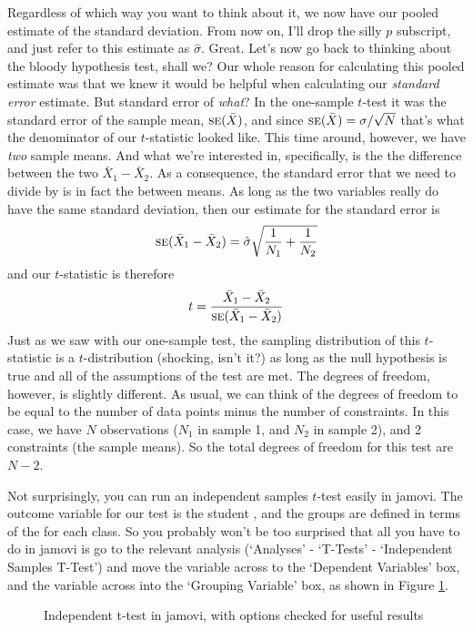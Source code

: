 Regardless of which way you want to think about it, we now have our pooled estimate of the standard deviation. From now on, I'll drop the silly $p$ subscript, and just refer to this estimate as $\hat\sigma$. Great. Let's now go back to thinking about the bloody hypothesis test, shall we? Our whole reason for calculating this pooled estimate was that we knew it would be helpful when calculating our {\it standard error} estimate. But standard error of {\it what}? In the one-sample $t$-test it was the standard error of the sample mean, $\mbox{\textsc{se}}(\bar{X})$, and since $\mbox{\textsc{se}}(\bar{X}) = \sigma / \sqrt{N}$ that's what the denominator of our $t$-statistic looked like. This time around, however, we have {\it two} sample means. And what we're interested in, specifically, is the the difference between the two $\bar{X}_1 - \bar{X}_2$. As a consequence, the standard error that we need to divide by is in fact the  between means. As long as the two variables really do have the same standard deviation, then our estimate for the standard error is
$$
\mbox{\textsc{se}}(\bar{X}_1 - \bar{X}_2) = \hat\sigma \sqrt{\frac{1}{N_1} + \frac{1}{N_2}}
$$
and our $t$-statistic is therefore 
$$
t = \frac{\bar{X}_1 - \bar{X}_2}{\mbox{\textsc{se}}(\bar{X}_1 - \bar{X}_2)}
$$
Just as we saw with our one-sample test, the sampling distribution of this $t$-statistic is a $t$-distribution (shocking, isn't it?) as long as the null hypothesis is true and all of the assumptions of the test are met. The degrees of freedom, however, is slightly different. As usual, we can think of the degrees of freedom to be equal to the number of data points minus the number of constraints. In this case, we have $N$ observations ($N_1$ in sample 1, and $N_2$ in sample 2), and 2 constraints (the sample means). So the total degrees of freedom for this test are $N-2$. 


Not surprisingly, you can run an independent samples $t$-test easily in jamovi. The outcome variable for our test is the student , and the groups are defined in terms of the  for each class. So you probably won't be too surprised that all you have to do in jamovi is go to the relevant analysis (`Analyses' - `T-Tests' - `Independent Samples T-Test') and move the  variable across to the `Dependent Variables' box, and the  variable across into the `Grouping Variable' box, as shown in Figure \ref{fig:ttest_ind}.

\begin{figure}[htb]
\begin{center}
\caption{Independent t-test in jamovi, with options checked for useful results}
\HR
\label{fig:ttest_ind}
\end{center}
\end{figure}

